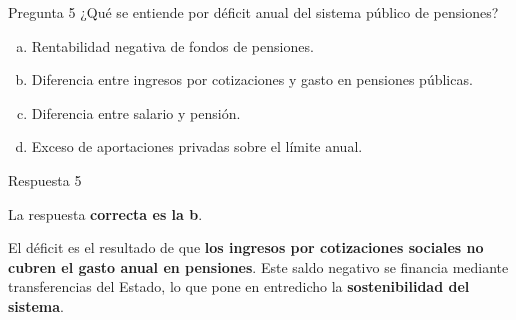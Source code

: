 \documentclass[
  ignorenonframetext,
  aspectratio=54,
  spanish,
]{beamer}
\providecommand{\tightlist}{%
  \setlength{\itemsep}{0pt}\setlength{\parskip}{0pt}}
\begin{document}
\begin{frame}{Pregunta 5}
\label{pregunta-5}
¿Qué se entiende por déficit anual del sistema público de pensiones?

\begin{enumerate}
[a.]
\tightlist
\item
  Rentabilidad negativa de fondos de pensiones.
\item
  Diferencia entre ingresos por cotizaciones y gasto en pensiones
  públicas.
\item
  Diferencia entre salario y pensión.
\item
  Exceso de aportaciones privadas sobre el límite anual.
\end{enumerate}
\end{frame}

\begin{frame}{Respuesta 5}
\label{respuesta-5}
\begin{tcolorbox}[enhanced jigsaw, rightrule=.15mm, colback=white, arc=.35mm, colframe=quarto-callout-tip-color-frame, leftrule=.75mm, bottomrule=.15mm, left=2mm, toprule=.15mm, opacityback=0, breakable]
\begin{minipage}[t]{5.5mm}
\textcolor{quarto-callout-tip-color}{\faLightbulb}
\end{minipage}%
\begin{minipage}[t]{\textwidth - 5.5mm}

La respuesta \textbf{correcta es la b}.

El déficit es el resultado de que \textbf{los ingresos por cotizaciones
sociales no cubren el gasto anual en pensiones}. Este saldo negativo se
financia mediante transferencias del Estado, lo que pone en entredicho
la \textbf{sostenibilidad del sistema}.

\end{minipage}%
\end{tcolorbox}
\end{frame}
\end{document}
